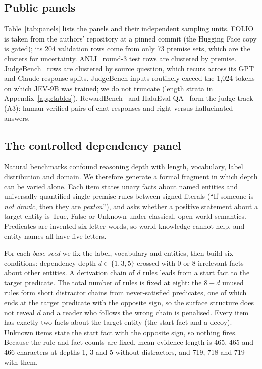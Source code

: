 \subsection{Public panels}
\label{sec:panels}
Table~\ref{tab:panels} lists the panels and their independent sampling units.
FOLIO~\citep{folio2024} is taken from the authors' repository at a pinned commit (the Hugging Face copy is gated); its 204 validation rows come from only 73 premise sets, which are the clusters for uncertainty.
ANLI~\citep{anli2020} round-3 test rows are clustered by premise.
JudgeBench~\citep{judgebench2025} rows are clustered by source question, which recurs across its GPT and Claude response splits.
JudgeBench inputs routinely exceed the 1{,}024 tokens on which JEV-9B was trained; we do not truncate (length strata in Appendix~\ref{app:tables}). RewardBench~\citep{rewardbench2024} and HaluEval-QA~\citep{halueval2023} form the judge track (A3): human-verified pairs of chat responses and right-versus-hallucinated answers.


\subsection{The controlled dependency panel}
\label{sec:controlled}
Natural benchmarks confound reasoning depth with length, vocabulary, label distribution and domain.
We therefore generate a formal fragment in which depth can be varied alone.
Each item states unary facts about named entities and universally quantified single-premise rules between signed literals (``If someone is \textit{not dravic}, then they are \textit{pexton}''), and asks whether a positive statement about a target entity is True, False or Unknown under classical, open-world semantics.
Predicates are invented six-letter words, so world knowledge cannot help, and entity names all have five letters.

For each \emph{base seed} we fix the label, vocabulary and entities, then build six conditions: dependency depth $d\in\{1,3,5\}$ crossed with $0$ or $8$ irrelevant facts about other entities.
A derivation chain of $d$ rules leads from a start fact to the target predicate.
The total number of rules is fixed at eight: the $8-d$ unused rules form short distractor chains from never-satisfied predicates, one of which ends at the target predicate with the opposite sign, so the surface structure does not reveal $d$ and a reader who follows the wrong chain is penalised.
Every item has exactly two facts about the target entity (the start fact and a decoy).
Unknown items state the start fact with the opposite sign, so nothing fires.
Because the rule and fact counts are fixed, mean evidence length is 465, 465 and 466 characters at depths 1, 3 and 5 without distractors, and 719, 718 and 719 with them.

